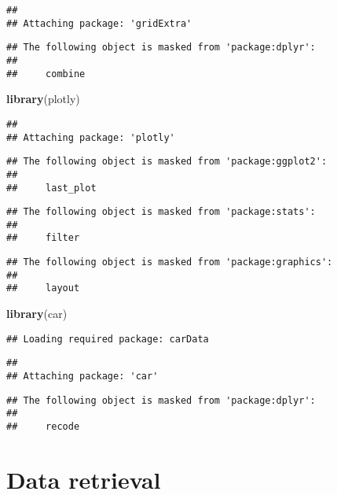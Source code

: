 \documentclass[
]{article}
\newenvironment{Shaded}{\begin{snugshade}}{\end{snugshade}}
\newcommand{\FunctionTok}[1]{\textcolor[rgb]{0.13,0.29,0.53}{\textbf{#1}}}
\newcommand{\NormalTok}[1]{#1}
\begin{document}
\begin{verbatim}
## 
## Attaching package: 'gridExtra'
\end{verbatim}

\begin{verbatim}
## The following object is masked from 'package:dplyr':
## 
##     combine
\end{verbatim}

\begin{Shaded}
\begin{Highlighting}[]
\FunctionTok{library}\NormalTok{(plotly)}
\end{Highlighting}
\end{Shaded}

\begin{verbatim}
## 
## Attaching package: 'plotly'
\end{verbatim}

\begin{verbatim}
## The following object is masked from 'package:ggplot2':
## 
##     last_plot
\end{verbatim}

\begin{verbatim}
## The following object is masked from 'package:stats':
## 
##     filter
\end{verbatim}

\begin{verbatim}
## The following object is masked from 'package:graphics':
## 
##     layout
\end{verbatim}

\begin{Shaded}
\begin{Highlighting}[]
\FunctionTok{library}\NormalTok{(car)}
\end{Highlighting}
\end{Shaded}

\begin{verbatim}
## Loading required package: carData
\end{verbatim}

\begin{verbatim}
## 
## Attaching package: 'car'
\end{verbatim}

\begin{verbatim}
## The following object is masked from 'package:dplyr':
## 
##     recode
\end{verbatim}

\hypertarget{data-retrieval}{%
\section{Data retrieval}\label{data-retrieval}}
\end{document}
